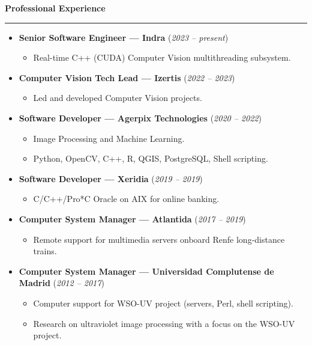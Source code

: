 \documentclass[10pt,a4paper]{article}
\newcommand{\sect}[1]{\vspace{6pt}\noindent\textbf{\large #1}\vspace{2pt}\hrule\vspace{6pt}}
\newcommand{\subsect}[1]{\vspace{4pt}\textbf{#1}}
\begin{document}
\sect{Professional Experience}
\begin{itemize}[leftmargin=*]
  
\item \subsect{Senior Software Engineer — Indra} (\textit{2023 -- present})
\begin{itemize}[leftmargin=*,label={}]
\item Real-time C++ (CUDA) Computer Vision multithreading subsystem.
\end{itemize}
  
\item \subsect{Computer Vision Tech Lead — Izertis} (\textit{2022 -- 2023})
\begin{itemize}[leftmargin=*,label={}]
\item Led and developed Computer Vision projects.
\end{itemize}

\item \subsect{Software Developer — Agerpix Technologies} (\textit{2020 -- 2022})
\begin{itemize}[leftmargin=*,label={}]
    \item Image Processing and Machine Learning.
    \item Python, OpenCV, C++, R, QGIS, PostgreSQL, Shell scripting.
\end{itemize}

\item \subsect{Software Developer — Xeridia} (\textit{2019 -- 2019})
\begin{itemize}[leftmargin=*,label={}]
    \item C/C++/Pro*C Oracle on AIX for online banking.
\end{itemize}

\item \subsect{Computer System Manager — Atlantida} (\textit{2017 -- 2019})
\begin{itemize}[leftmargin=*,label={}]
\item Remote support for multimedia servers onboard Renfe long-distance trains.
\end{itemize}

\item \subsect{Computer System Manager — Universidad Complutense de Madrid} (\textit{2012 -- 2017})
\begin{itemize}[leftmargin=*,label={}]
    \item Computer support for WSO-UV project (servers, Perl, shell scripting).
    \item Research on ultraviolet image processing with a focus on the WSO-UV project.
\end{itemize}


\end{itemize}
\end{document}
